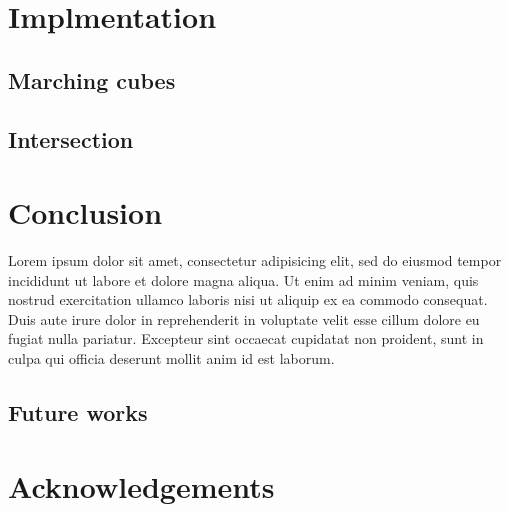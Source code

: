 \documentclass[conference]{acmsiggraph}
\begin{document}
\section{Implmentation}

\subsection{Marching cubes}

\subsection{Intersection}

\section{Conclusion}

Lorem ipsum dolor sit amet, consectetur adipisicing elit, sed do
eiusmod tempor incididunt ut labore et dolore magna aliqua. Ut enim ad
minim veniam, quis nostrud exercitation ullamco laboris nisi ut
aliquip ex ea commodo consequat. Duis aute irure dolor in
reprehenderit in voluptate velit esse cillum dolore eu fugiat nulla
pariatur. Excepteur sint occaecat cupidatat non proident, sunt in
culpa qui officia deserunt mollit anim id est laborum.

\subsection{Future works}

\section*{Acknowledgements}




\end{document}

